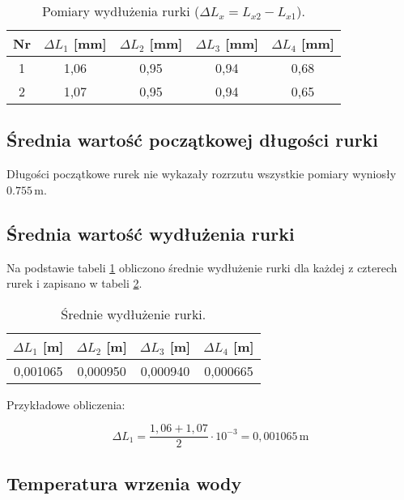 \documentclass[a4paper,12pt]{article}
\begin{document}
\begin{table}[H]
    \centering
    \begin{tabular}{|c|c|c|c|c|}
        \hline
        Nr & $\Delta L_1$ [mm] & $\Delta L_2$ [mm] & $\Delta L_3$ [mm] & $\Delta L_4$ [mm] \\
        \hline
        1 & 1,06 & 0,95 & 0,94 & 0,68 \\
        2 & 1,07 & 0,95 & 0,94 & 0,65 \\
        \hline
    \end{tabular}
    \caption{Pomiary wydłużenia rurki ($\Delta L_x = L_{x2} - L_{x1}$).}
    \label{tab:pomiary_wydluzenia}
\end{table}



\subsection{Średnia wartość początkowej długości rurki}

Długości początkowe rurek nie wykazały rozrzutu wszystkie pomiary wyniosły $0.755\,\text{m}$.

\subsection{Średnia wartość wydłużenia rurki}

Na podstawie tabeli \ref{tab:pomiary_wydluzenia} obliczono średnie wydłużenie rurki dla każdej z czterech rurek i zapisano w tabeli \ref{tab:srednie_wydluzenie}.

\begin{table}[H]
    \centering
    \begin{tabular}{|c|c|c|c|}
        \hline
        $\Delta L_1$ [m] & $\Delta L_2$ [m] & $\Delta L_3$ [m] & $\Delta L_4$ [m] \\
        \hline
        0,001065 & 0,000950 & 0,000940 & 0,000665 \\
        \hline
    \end{tabular}
    \caption{Średnie wydłużenie rurki.}
    \label{tab:srednie_wydluzenie}
\end{table}

Przykładowe obliczenia:

\begin{equation*}
    \Delta L_1 = \frac{1,06 + 1,07}{2} \cdot 10^{-3} = 0,001065\,\text{m}
\end{equation*}

\subsection{Temperatura wrzenia wody}
\end{document}
